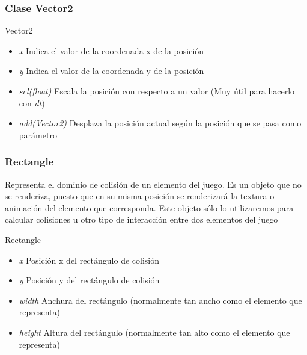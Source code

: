 \documentclass[xcolor={dvipsnames}]{beamer}
\begin{document}
\begin{frame}\frametitle{Clase Vector2}
    \begin{block}{Vector2}
    \begin{itemize}
        \item \emph{x} Indica el valor de la coordenada x de la posición
        \item \emph{y} Indica el valor de la coordenada y de la posición
        \item \emph{scl(float)} Escala la posición con respecto a un valor (Muy útil para hacerlo con \emph{dt})
        \item \emph{add(Vector2)} Desplaza la posición actual según la posición que se pasa como parámetro
    \end{itemize}
    \end{block}
\end{frame}

\begin{frame}\frametitle{Rectangle}
    Representa el dominio de colisión de un elemento del juego. Es un objeto que no se renderiza, puesto que en su misma posición se
    renderizará la textura o animación del elemento que corresponda. Este objeto sólo lo utilizaremos para calcular colisiones u otro tipo
    de interacción entre dos elementos del juego
    \begin{block}{Rectangle}
    \begin{itemize}
        \item \emph{x} Posición x del rectángulo de colisión
        \item \emph{y} Posición y del rectángulo de colisión
        \item \emph{width} Anchura del rectángulo (normalmente tan ancho como el elemento que representa)
        \item \emph{height} Altura del rectángulo (normalmente tan alto como el elemento que representa)
    \end{itemize}
    \end{block}
\end{frame}
\end{document}
